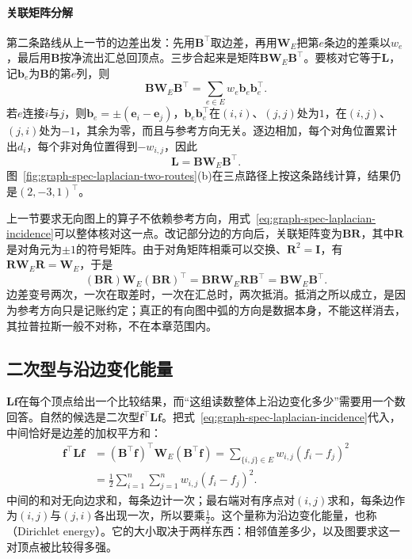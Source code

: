 \paragraph{关联矩阵分解}
第二条路线从上一节的边差出发：先用$\bm B^{\top}$取边差，再用$\bm W_E$把第$e$条边的差乘以$w_e$，最后用$\bm B$按净流出汇总回顶点。三步合起来是矩阵$\bm B\bm W_E\bm B^{\top}$。要核对它等于$\bm L$，记$\bm b_e$为$\bm B$的第$e$列，则
\[
 \bm B\bm W_E\bm B^{\top}=\sum_{e\in E}w_e\bm b_e\bm b_e^{\top}.
\]
若$e$连接$i$与$j$，则$\bm b_e=\pm(\bm e_i-\bm e_j)$，$\bm b_e\bm b_e^{\top}$在$(i,i)$、$(j,j)$处为$1$，在$(i,j)$、$(j,i)$处为$-1$，其余为零，而且与参考方向无关。逐边相加，每个对角位置累计出$d_i$，每个非对角位置得到$-w_{i,j}$，因此
\begin{equation}
 \bm L=\bm B\bm W_E\bm B^{\top}.
 \label{eq:graph-spec-laplacian-incidence}
\end{equation}
图~\ref{fig:graph-spec-laplacian-two-routes}(b)在三点路径上按这条路线计算，结果仍是$(2,-3,1)^{\top}$。

上一节要求无向图上的算子不依赖参考方向，用式~\eqref{eq:graph-spec-laplacian-incidence}可以整体核对这一点。改记部分边的方向后，关联矩阵变为$\bm B\bm R$，其中$\bm R$是对角元为$\pm1$的符号矩阵。由于对角矩阵相乘可以交换、$\bm R^2=\bm I$，有$\bm R\bm W_E\bm R=\bm W_E$，于是
\[
 (\bm B\bm R)\bm W_E(\bm B\bm R)^{\top}=\bm B\bm R\bm W_E\bm R\bm B^{\top}=\bm B\bm W_E\bm B^{\top}.
\]
边差变号两次，一次在取差时，一次在汇总时，两次抵消。抵消之所以成立，是因为参考方向只是记账约定；真正的有向图中弧的方向是数据本身，不能这样消去，其拉普拉斯一般不对称，不在本章范围内。

\subsection{二次型与沿边变化能量}
\label{sec:graph-spec-dirichlet-energy}

$\bm L\bm f$在每个顶点给出一个比较结果，而“这组读数整体上沿边变化多少”需要用一个数回答。自然的候选是二次型$\bm f^{\top}\bm L\bm f$。把式~\eqref{eq:graph-spec-laplacian-incidence}代入，中间恰好是边差的加权平方和：
\begin{equation}
 \begin{aligned}
 \bm f^{\top}\bm L\bm f
 &=(\bm B^{\top}\bm f)^{\top}\bm W_E(\bm B^{\top}\bm f)
 =\sum_{\{i,j\}\in E}w_{i,j}(f_i-f_j)^2\\
 &=\frac12\sum_{i=1}^n\sum_{j=1}^nw_{i,j}(f_i-f_j)^2 .
 \end{aligned}
 \label{eq:graph-spec-dirichlet-energy}
\end{equation}
中间的和对无向边求和，每条边计一次；最右端对有序点对$(i,j)$求和，每条边作为$(i,j)$与$(j,i)$各出现一次，所以要乘$\frac12$。这个量称为沿边变化能量，也称（Dirichlet energy）。它的大小取决于两样东西：相邻值差多少，以及图要求这一对顶点被比较得多强。

